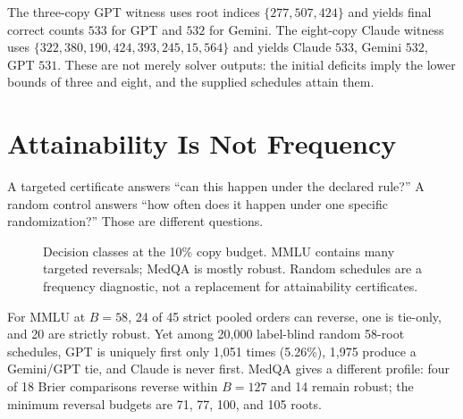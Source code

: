 \documentclass[conference]{IEEEtran}
\begin{document}
The three-copy GPT witness uses root indices $\{277,507,424\}$ and yields final correct counts $533$ for GPT and $532$ for Gemini. The eight-copy Claude witness uses $\{322,380,190,424,393,245,15,564\}$ and yields Claude $533$, Gemini $532$, GPT $531$. These are not merely solver outputs: the initial deficits imply the lower bounds of three and eight, and the supplied schedules attain them.

\Needspace{0.38\textheight}
\section{Attainability Is Not Frequency}
A targeted certificate answers ``can this happen under the declared rule?'' A random control answers ``how often does it happen under one specific randomization?'' Those are different questions.

\begin{figure}[H]
\centering
{}
\caption{Decision classes at the 10\% copy budget. MMLU contains many targeted reversals; MedQA is mostly robust. Random schedules are a frequency diagnostic, not a replacement for attainability certificates.}
\label{fig:robust}
\end{figure}

For MMLU at $B=58$, 24 of 45 strict pooled orders can reverse, one is tie-only, and 20 are strictly robust. Yet among 20,000 label-blind random 58-root schedules, GPT is uniquely first only 1,051 times (5.26\%), 1,975 produce a Gemini/GPT tie, and Claude is never first. MedQA gives a different profile: four of 18 Brier comparisons reverse within $B=127$ and 14 remain robust; the minimum reversal budgets are 71, 77, 100, and 105 roots.
\end{document}
